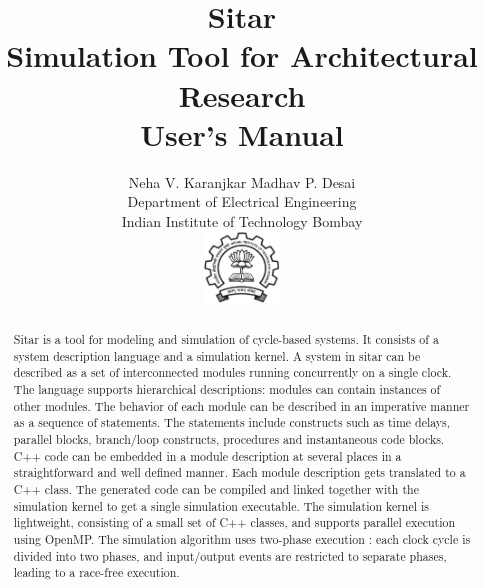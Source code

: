 \documentclass[12pt,a4paper]{article}
\title{{\Huge Sitar}\\
{\large Simulation Tool for Architectural Research}\\[1em]
User's Manual}
\author{Neha V. Karanjkar \qquad Madhav P. Desai\\
{\small Department of Electrical Engineering}\\
{\small Indian Institute of Technology Bombay}\\[1em]
\includegraphics[width=0.15\textwidth]{./figures/iitblogo.pdf}\\
}
\date{}
\begin{document}
\maketitle

\begin{abstract}
Sitar is a tool for modeling and simulation of cycle-based systems.
It consists of a system description language and a simulation kernel.  
%
A system in sitar can be described as a set of interconnected modules running
concurrently on a single clock.  The language supports hierarchical
descriptions: modules can contain instances of other modules.
%
The behavior of each module can be described in an imperative manner as a
sequence of statements.  The statements include constructs such as time delays,
parallel blocks, branch/loop constructs, procedures and
instantaneous code blocks.  C++ code can be embedded in a module description at
several places in a straightforward and well defined manner.
Each module description gets translated to a C++ class. The generated code can
be compiled and linked together with the simulation kernel to get a single
simulation executable.  
%
The simulation kernel is lightweight, consisting of a
small set of C++ classes, and supports parallel execution using OpenMP. 
The simulation algorithm uses two-phase execution : each clock cycle
is divided into two phases, and input/output events are
restricted to separate phases, leading to a race-free execution.
\end{abstract}
\tableofcontents
\newpage
\end{document}
